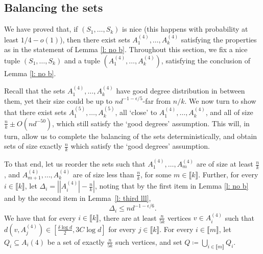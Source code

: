 \documentclass[notitlepage]{scrartcl}
\newcommand{\br}[1]{\llbracket{#1}\rrbracket}
\begin{document}
\subsection{Balancing the sets}\label{s: equal size} 

We have proved that, if $(S_1,\ldots,S_k)$ is nice (this happens with probability at least $1/4-o(1)$), then there exist sets $A_1^{(4)},\ldots, A_k^{(4)}$ satisfying the properties as in the statement of Lemma \ref{l: no b}.
Throughout this section, we fix a nice tuple $(S_1,\ldots,S_k)$ and a tuple $(A_1^{(4)},\ldots,A_k^{(4)})$, satisfying the conclusion of Lemma \ref{l: no b}.


Recall that the sets $A_1^{(4)},\ldots, A_k^{(4)}$ have good degree distribution in between them, yet their size could be up to $nd^{-1-\epsilon/5}$-far from $n/k$. We now turn to show that there exist sets $A_1^{(5)},\ldots, A_k^{(5)}$, all `close' to $A_1^{(4)},\ldots, A_k^{(4)}$, and all of size $\frac{n}{k}\pm O(nd^{-50})$, which still satisfy the `good degrees' assumption. This will, in turn, allow us to complete the balancing of the sets deterministically, and obtain sets of size exactly $\frac{n}{k}$ which satisfy the `good degrees' assumption. 

To that end, let us reorder the sets such that $A_1^{(4)},\ldots, A_m^{(4)}$ are of size at least $\frac{n}{k}$, and $A_{m+1}^{(4)},\ldots,A_k^{(4)}$ are of size less than $\frac{n}{k}$, for some $m\in \br{k}$. Further, for every $i\in \br{k}$, let $\Delta_i=\left||A_i^{(4)}|-\frac{n}{k}\right|$, noting that by the first item in Lemma \ref{l: no b} and by the second item in Lemma~\ref{l: third lll}, 
\begin{equation}
\Delta_i\le nd^{-1-\epsilon/6}.
\label{eq:Delta_i_upper_bound}
\end{equation} 
We have that for every $i\in \br{k}$, there are at least $\frac{n}{5k}$ vertices $v\in A_i^{(4)}$ such that $d(v,A_j^{(4)})\in \left[\frac{\delta\log d}{2}, 3C\log d\right]$ for every $j\in \br{k}$. For every $i\in \br{m}$, let $Q_i\subseteq A_i(4)$ be a set of exactly $\frac{n}{5k}$ such vertices, and set $Q\coloneqq\bigcup_{i\in \br{m}}Q_i$. 
\end{document}
